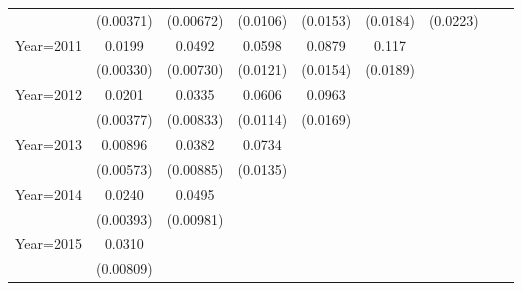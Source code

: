 \begin{table}[htbp]
\begin{tabular}{l*{8}{c}}
                    &   (0.00371)         &   (0.00672)         &    (0.0106)         &    (0.0153)         &    (0.0184)         &    (0.0223)         &                     &                     \\
[1em]
Year=2011           &      0.0199\sym{***}&      0.0492\sym{***}&      0.0598\sym{***}&      0.0879\sym{***}&       0.117\sym{***}&                     &                     &                     \\
                    &   (0.00330)         &   (0.00730)         &    (0.0121)         &    (0.0154)         &    (0.0189)         &                     &                     &                     \\
[1em]
Year=2012           &      0.0201\sym{***}&      0.0335\sym{***}&      0.0606\sym{***}&      0.0963\sym{***}&                     &                     &                     &                     \\
                    &   (0.00377)         &   (0.00833)         &    (0.0114)         &    (0.0169)         &                     &                     &                     &                     \\
[1em]
Year=2013           &     0.00896         &      0.0382\sym{***}&      0.0734\sym{***}&                     &                     &                     &                     &                     \\
                    &   (0.00573)         &   (0.00885)         &    (0.0135)         &                     &                     &                     &                     &                     \\
[1em]
Year=2014           &      0.0240\sym{***}&      0.0495\sym{***}&                     &                     &                     &                     &                     &                     \\
                    &   (0.00393)         &   (0.00981)         &                     &                     &                     &                     &                     &                     \\
[1em]
Year=2015           &      0.0310\sym{***}&                     &                     &                     &                     &                     &                     &                     \\
                    &   (0.00809)         &                     &                     &                     &                     &                     &                     &                     \\

\end{tabular}
\end{table}
